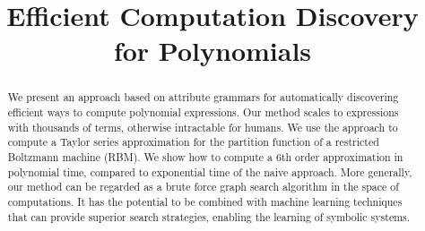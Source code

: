 \documentclass[]{article}
\title{Efficient Computation Discovery for Polynomials}
\numberwithin{equation}{section}
\begin{document}
 

\maketitle





 

\begin{abstract} We present an approach based on attribute grammars
  for automatically discovering efficient ways to compute polynomial
  expressions. Our method scales to expressions with thousands of
  terms, otherwise intractable
  for humans. We use the approach to
  compute a Taylor series approximation for the partition function of
  a restricted Boltzmann machine (RBM). We show how to compute a 6th
  order approximation in polynomial time, compared to exponential time
  of the naive approach. More generally, our method can be regarded as
  a brute force graph search algorithm in the space of computations. It 
has the potential to be combined with machine
  learning techniques that can provide superior search strategies,
  enabling the learning of symbolic systems. 

\end{abstract} 









\nocite{*}


\end{document}
